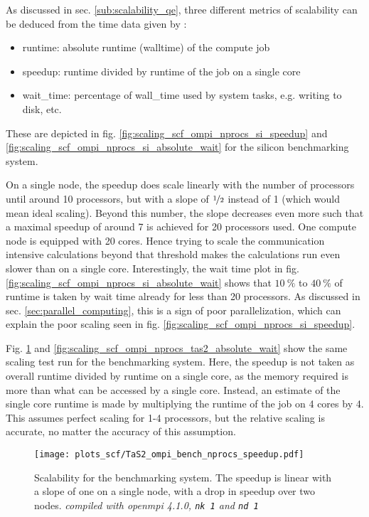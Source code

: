 \documentclass[main.tex]{subfiles}
\begin{document}
As discussed in sec. \ref{sub:scalability_qe}, three different metrics of scalability can be deduced from the time data given by \QE:
\begin{itemize}
    \item runtime: absolute runtime (walltime) of the compute job
    \item speedup: runtime divided by runtime of the job on a single core
    \item \gls{wait_time}: percentage of \gls{wall_time} used by system tasks, e.g. writing to disk, etc.
\end{itemize}
These are depicted in fig. \ref{fig:scaling_scf_ompi_nprocs_si_speedup} and \ref{fig:scaling_scf_ompi_nprocs_si_absolute_wait} for the silicon benchmarking system.

On a single node, the speedup does scale linearly with the number of processors until around 10 processors, but with a slope of \(\nicefrac{1}{2}\) instead of 1 (which would mean ideal scaling).
Beyond this number, the slope decreases even more such that a maximal speedup of around 7 is achieved for 20 processors used.
One compute node is equipped with 20 cores. Hence trying to scale the communication intensive calculations beyond that threshold makes the calculations run even slower than on a single core.
Interestingly, the wait time plot in fig. \ref{fig:scaling_scf_ompi_nprocs_si_absolute_wait} shows that \(\SI{10}{\percent}\) to \(\SI{40}{\percent}\) of runtime is taken by wait time already for less than 20 processors.
As discussed in sec. \ref{sec:parallel_computing}, this is a sign of poor parallelization, which can explain the poor scaling seen in fig. \ref{fig:scaling_scf_ompi_nprocs_si_speedup}.

Fig. \ref{fig:scaling_scf_ompi_nprocs_tas2_speedup} and \ref{fig:scaling_scf_ompi_nprocs_tas2_absolute_wait} show the same scaling test run for the \TaS benchmarking system.
Here, the speedup is not taken as overall runtime divided by runtime on a single core, as the memory required is more than what can be accessed by a single core.
Instead, an estimate of the single core runtime is made by multiplying the runtime of the job on 4 cores by 4. 
This assumes perfect scaling for 1-4 processors, but the relative scaling is accurate, no matter the accuracy of this assumption.

\begin{figure}
\centering
\texttt{[image: plots\_scf/TaS2\_ompi\_bench\_nprocs\_speedup.pdf]}
\caption{Scalability for the \TaS benchmarking system. The speedup is linear with a slope of one on a single node, with a drop in speedup over two nodes. \emph{ compiled with \gls{openmpi} 4.1.0, \texttt{nk 1} and \texttt{nd 1}}}
\label{fig:scaling_scf_ompi_nprocs_tas2_speedup}
\end{figure}
\end{document}
